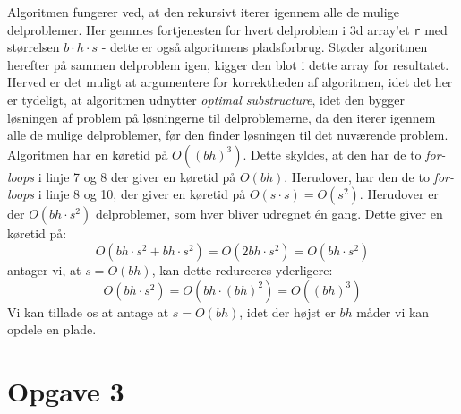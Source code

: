 \documentclass{report}
\begin{document}
Algoritmen fungerer ved, at den rekursivt iterer igennem alle de mulige delproblemer. Her gemmes fortjenesten for hvert delproblem i 3d array'et \texttt{r} med størrelsen $b \cdot h \cdot s$ - dette er også algoritmens pladsforbrug. Støder algoritmen herefter på sammen delproblem igen, kigger den blot i dette array for resultatet. Herved er det muligt at argumentere for korrektheden af algoritmen, idet det her er tydeligt, at algoritmen udnytter \textit{optimal substructure}, idet den bygger løsningen af problem på løsningerne til delproblemerne, da den iterer igennem alle de mulige delproblemer, før den finder løsningen til det nuværende problem. \\
Algoritmen har en køretid på $O((bh)^3)$. Dette skyldes, at den har de to \textit{for-loops} i linje 7 og 8 der giver en køretid på $O(bh)$. Herudover, har den de to \textit{for-loops} i linje 8 og 10, der giver en køretid på $O(s \cdot s) = O(s^2)$. Herudover er der $O(bh \cdot s^2)$ delproblemer, som hver bliver udregnet én gang. Dette giver en køretid på:
$$O(bh \cdot s^2 + bh \cdot s^2) = O(2 bh \cdot s^2) = O(bh \cdot s^2)$$
antager vi, at $s = O(bh)$, kan dette redurceres yderligere:
$$O(bh \cdot s^2) = O(bh \cdot (bh)^2) = O((bh)^3)$$
Vi kan tillade os at antage at $s = O(bh)$, idet der højst er $bh$ måder vi kan opdele en plade. \\
\newpage


\section*{Opgave 3}
\end{document}
